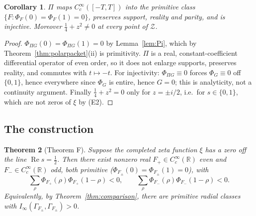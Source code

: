\documentclass[11pt]{amsart}
\newtheorem{theorem}{Theorem}[section]
\newtheorem{corollary}[theorem]{Corollary}
\theoremstyle{definition}
\theoremstyle{remark}
\newcommand{\R}{\mathbb R}
\newcommand{\Rel}{\operatorname{Re}}
\begin{document}
\begin{corollary}
\label{cor:Pi}
$\Pi$ maps $C_c^\infty([-T,T])$ into the primitive class
$\{F:\Phi_F(0)=\Phi_F(1)=0\}$, preserves support, reality and parity, and is
injective.  Moreover $\tfrac14+z^2\ne0$ at every point of $\mathcal Z$.
\end{corollary}

\begin{proof}
$\Phi_{\Pi G}(0)=\Phi_{\Pi G}(1)=0$ by Lemma~\ref{lem:Pi}, which by
Theorem~\ref{thm:polarpacket}(ii) is primitivity.  $\Pi$ is a real,
constant-coefficient differential operator of even order, so it does not
enlarge supports, preserves reality, and commutes with $t\mapsto-t$.  For
injectivity: $\Phi_{\Pi G}\equiv0$ forces $\Phi_G\equiv0$ off $\{0,1\}$, hence
everywhere since $\Phi_G$ is entire, hence $G=0$; this is analyticity, not a
continuity argument.  Finally $\tfrac14+z^2=0$ only for $z=\pm i/2$, i.e.\ for
$s\in\{0,1\}$, which are not zeros of $\xi$ by (E2).
\end{proof}

\subsection{The construction}

\begin{theorem}[Theorem F]
\label{thm:sufficiency}
Suppose the completed zeta function $\xi$ has a zero off the line
$\Rel s=\tfrac12$.  Then there exist nonzero real $F_+\in C_c^\infty(\R)$ even
and $F_-\in C_c^\infty(\R)$ odd, both primitive
($\Phi_{F_\pm}(0)=\Phi_{F_\pm}(1)=0$), with
\begin{equation}
  \sum_\rho\Phi_{F_+}(\rho)\Phi_{F_+}(1-\rho)<0,
  \qquad
  \sum_\rho\Phi_{F_-}(\rho)\Phi_{F_-}(1-\rho)<0 .
\tag{11.4}
\end{equation}
Equivalently, by Theorem~\emph{\ref{thm:comparison}}, there are primitive
radial classes with $I_\infty(\Gamma_{F_\pm},\Gamma_{F_\pm})>0$.
\end{theorem}
\end{document}
